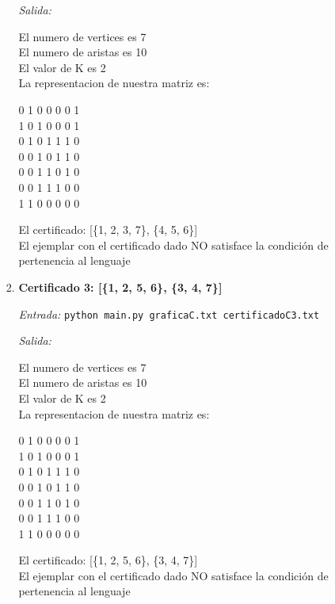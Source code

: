 \documentclass[12pt,letterpaper]{article}
\begin{document}
\begin{itemize}
\begin{itemize}
\begin{enumerate}
            \textit{Salida:}

            El numero de vertices es 7 \\
            El numero de aristas es 10 \\
            El valor de K es 2 \\
            La representacion de nuestra matriz es:
            \begin{center}
                0 1 0 0 0 0 1 \\
                1 0 1 0 0 0 1 \\
                0 1 0 1 1 1 0 \\
                0 0 1 0 1 1 0 \\
                0 0 1 1 0 1 0 \\
                0 0 1 1 1 0 0 \\
                1 1 0 0 0 0 0 \\
            \end{center}
            El certificado: [\{1, 2, 3, 7\}, \{4, 5, 6\}] \\
            El ejemplar con el certificado dado NO satisface la condición
            de pertenencia al lenguaje
            
            \item \textbf{Certificado 3: [\{1, 2, 5, 6\}, \{3, 4, 7\}]}
            
            \textit{Entrada:}
            \texttt{python main.py graficaC.txt certificadoC3.txt}
            
            \textit{Salida:}

            El numero de vertices es 7 \\
            El numero de aristas es 10 \\
            El valor de K es 2 \\
            La representacion de nuestra matriz es:
            \begin{center}
                0 1 0 0 0 0 1 \\
                1 0 1 0 0 0 1 \\
                0 1 0 1 1 1 0 \\
                0 0 1 0 1 1 0 \\
                0 0 1 1 0 1 0 \\
                0 0 1 1 1 0 0 \\
                1 1 0 0 0 0 0 \\
            \end{center}
            El certificado: [\{1, 2, 5, 6\}, \{3, 4, 7\}] \\
            El ejemplar con el certificado dado NO satisface la condición
            de pertenencia al lenguaje
            

\end{enumerate}
\end{itemize}
\end{itemize}
\end{document}
